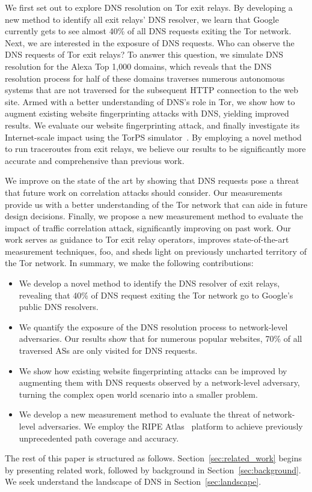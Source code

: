 We first set out to explore DNS resolution on Tor exit relays.  By developing a
new method to identify all exit relays' DNS resolver, we learn that Google
currently gets to see almost 40\% of all DNS requests exiting the Tor network.
Next, we are interested in the exposure of DNS requests.  Who can observe the
DNS requests of Tor exit relays?  To answer this question, we simulate DNS
resolution for the Alexa Top 1,000 domains, which reveals that the DNS
resolution process for half of these domains traverses numerous autonomous
systems that are not traversed for the subsequent HTTP connection to the web
site.  Armed with a better understanding of DNS's role in Tor, we show how to
augment existing website fingerprinting attacks with DNS, yielding improved
results.    We evaluate our website fingerprinting
attack, and finally investigate its Internet-scale impact using the TorPS
simulator~\cite{TorPS}.  By employing a novel method to run traceroutes from
exit relays, we believe our results to be significantly more accurate and
comprehensive than previous work.

We improve on the state of the art by showing that DNS requests pose a threat
that future work on correlation attacks should consider.  Our measurements
provide us with a better understanding of the Tor network that can aide in
future design decisions.  Finally, we propose a new measurement method to
evaluate the impact of traffic correlation attack, significantly improving on
past work.  Our work \first serves as guidance to Tor exit relay operators,
\second improves state-of-the-art measurement techniques, \third foo, \fourth
and sheds light on previously uncharted territory of the Tor network.  In
summary, we make the following contributions:
\begin{itemize}
	\item We develop a novel method to identify the DNS resolver of exit relays,
		revealing that 40\% of DNS request exiting the Tor network go to
		Google's public DNS resolvers.

	\item We quantify the exposure of the DNS resolution process to
		network-level adversaries.  Our results show that for numerous popular
		websites, 70\% of all traversed ASs are only visited for DNS requests.

	\item We show how existing website fingerprinting attacks can be improved by
		augmenting them with DNS requests observed by a network-level adversary,
		turning the complex open world scenario into a smaller problem.

	\item We develop a new measurement method to evaluate the threat of
		network-level adversaries.  We employ the RIPE Atlas~\cite{atlas}
		platform to achieve previously unprecedented path coverage and accuracy.
\end{itemize}

The rest of this paper is structured as follows.
Section~\ref{sec:related_work} begins by presenting related work, followed by
background in Section~\ref{sec:background}.  We seek understand the landscape
of DNS in Section~\ref{sec:landscape}.  
